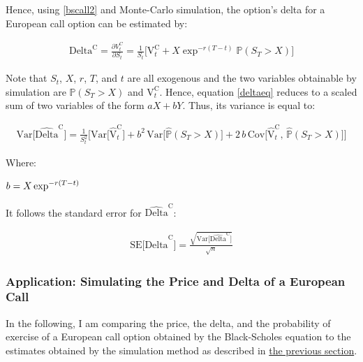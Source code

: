 \documentclass[
  12pt,
]{article}
\begin{document}
Hence, using \eqref{bscall2} and Monte-Carlo simulation, the option's
delta for a European call option can be estimated by:

\begin{align}
\text{Delta}^{\text{C}} = \frac{\partial{V^C_t}}{{\partial S_t}} = \frac{1}{S_t} \bigg[ \text{V}^{\text{C}}_t + X \exp^{-r(T-t)} \mathbb{P}(S_T > X) \bigg] \label{deltaeq}
\end{align}

Note that \(S_t\), \(X\), \(r\), \(T\), and \(t\) are all exogenous and
the two variables obtainable by simulation are \(\mathbb{P}(S_T > X)\)
and \(\text{V}^{\text{C}}_t\). Hence, equation \eqref{deltaeq} reduces
to a scaled sum of two variables of the form \(aX + bY\). Thus, its
variance is equal to:

\begin{align}
\text{Var}\big[\hat{\text{Delta}}^\text{C}\big] = \frac{1}{S_t^2} \bigg[ \text{Var}\big[\hat{\text{V}}^{\text{C}}_t\big] + b^2\, \text{Var}\big[\hat{\mathbb P}(S_T > X)\big] + 2\, b\, \text{Cov}\big[\hat{\text{V}}^{\text{C}}_t,\, \hat{\mathbb P}(S_T > X)  \big] \bigg] \label{vardelta}
\end{align}

Where:

\(\begin{aligned} b &= X\exp^{-r(T-t)} \notag \end{aligned}\)

It follows the standard error for \(\hat{\text{Delta}}^\text{C}\):

\begin{align}
\text{SE}\big[\hat{\text{Delta}}^\text{C}\big] = \frac{\sqrt{\text{Var}\big[\hat{\text{Delta}}^\text{C}\big]}}{\sqrt{n}} \label{sedelta}
\end{align}

\hypertarget{application-simulating-the-price-and-delta-of-a-european-call}{%
\subsubsection{Application: Simulating the Price and Delta of a European
Call}\label{application-simulating-the-price-and-delta-of-a-european-call}}

In the following, I am comparing the price, the delta, and the
probability of exercise of a European call option obtained by the
Black-Scholes equation to the estimates obtained by the simulation
method as described in
\protect\hyperlink{simulating-a-vanilla-options-delta}{the previous
section}.
\end{document}
